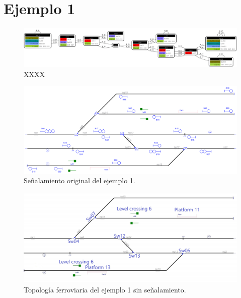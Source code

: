 \section{Ejemplo 1}

    \lipsum[1]
    
    \begin{figure}[h]
    	\centering
    	\includegraphics[width=1\textwidth]{Figuras/Graph_1}
    	\centering\caption{XXXX}
    \end{figure}
    
    \lipsum[1]

    \begin{figure}[h]
        \centering
        \includegraphics[width=1\textwidth]{resultados-obtenidos/ejemplo1/images/1_original.png}
        \centering\caption{Señalamiento original del ejemplo 1.}
    \end{figure}

    \begin{figure}[h]
        \centering
        \includegraphics[width=1\textwidth]{resultados-obtenidos/ejemplo1/images/1_empty.png}
        \centering\caption{Topología ferroviaria del ejemplo 1 sin señalamiento.}
    \end{figure}

